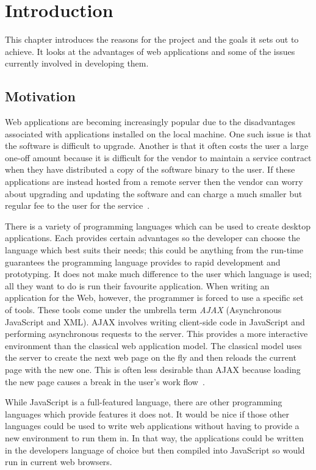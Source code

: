 \chapter{Introduction}

This chapter introduces the reasons for the project and the goals it sets out to achieve. It looks at the advantages of web applications and some of the issues currently involved in developing them.

\section{Motivation}
Web applications are becoming increasingly popular due to the disadvantages associated with applications installed on the local machine. One such issue is that the software is difficult to upgrade. Another is that it often costs the user a large one-off amount because it is difficult for the vendor to maintain a service contract when they have distributed a copy of the software binary to the user. If these applications are instead hosted from a remote server then the vendor can worry about upgrading and updating the software and can charge a much smaller but regular fee to the user for the service~\cite{bib:road_ahead}.

There is a variety of programming languages which can be used to create desktop applications. Each provides certain advantages so the developer can choose the language which best suits their needs; this could be anything from the run-time guarantees the programming language provides to rapid development and prototyping. It does not make much difference to the user which language is used; all they want to do is run their favourite application. When writing an application for the Web, however, the programmer is forced to use a specific set of tools. These tools come under the umbrella term \emph{AJAX} (Asynchronous JavaScript and XML). AJAX involves writing client-side code in JavaScript and performing asynchronous requests to the server. This provides a more interactive environment than the classical web application model. The classical model uses the server to create the next web page on the fly and then reloads the current page with the new one. This is often less desirable than AJAX because loading the new page causes a break in the user's work flow~\cite{bib:ajax}.

While JavaScript is a full-featured language, there are other programming languages which provide features it does not. It would be nice if those other languages could be used to write web applications without having to provide a new environment to run them in. In that way, the applications could be written in the developers language of choice but then compiled into JavaScript so would run in current web browsers.

